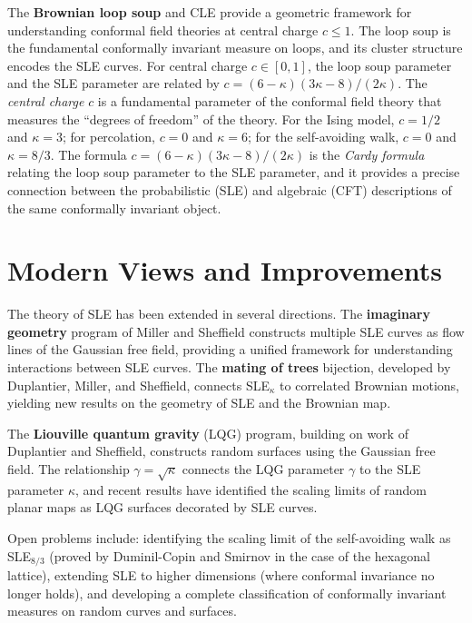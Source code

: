The \textbf{Brownian loop soup} and CLE provide a geometric framework for understanding conformal field theories at central charge $c \leq 1$. The loop soup is the fundamental conformally invariant measure on loops, and its cluster structure encodes the SLE curves. For central charge $c \in [0, 1]$, the loop soup parameter and the SLE parameter are related by $c = (6-\kappa)(3\kappa-8)/(2\kappa)$. The \emph{central charge} $c$ is a fundamental parameter of the conformal field theory that measures the ``degrees of freedom'' of the theory. For the Ising model, $c = 1/2$ and $\kappa = 3$; for percolation, $c = 0$ and $\kappa = 6$; for the self-avoiding walk, $c = 0$ and $\kappa = 8/3$. The formula $c = (6-\kappa)(3\kappa-8)/(2\kappa)$ is the \emph{Cardy formula} relating the loop soup parameter to the SLE parameter, and it provides a precise connection between the probabilistic (SLE) and algebraic (CFT) descriptions of the same conformally invariant object.

\section{Modern Views and Improvements}\label{ch2006wendelinwerner:modern-views-and-improvements}

The theory of SLE has been extended in several directions. The \textbf{imaginary geometry} program of Miller and Sheffield constructs multiple SLE curves as flow lines of the Gaussian free field, providing a unified framework for understanding interactions between SLE curves. The \textbf{mating of trees} bijection, developed by Duplantier, Miller, and Sheffield, connects SLE$_\kappa$ to correlated Brownian motions, yielding new results on the geometry of SLE and the Brownian map.

The \textbf{Liouville quantum gravity} (LQG) program, building on work of Duplantier and Sheffield, constructs random surfaces using the Gaussian free field. The relationship $\gamma = \sqrt{\kappa}$ connects the LQG parameter $\gamma$ to the SLE parameter $\kappa$, and recent results have identified the scaling limits of random planar maps as LQG surfaces decorated by SLE curves.

Open problems include: identifying the scaling limit of the self-avoiding walk as SLE$_{8/3}$ (proved by Duminil-Copin and Smirnov in the case of the hexagonal lattice), extending SLE to higher dimensions (where conformal invariance no longer holds), and developing a complete classification of conformally invariant measures on random curves and surfaces.

